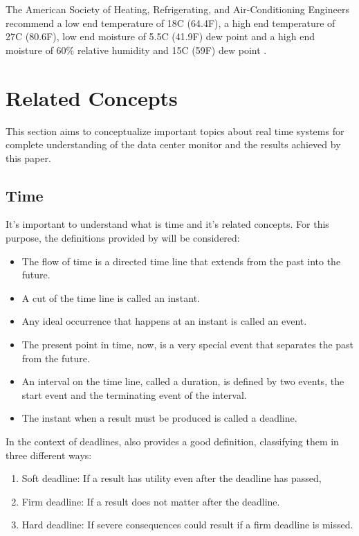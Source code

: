 \documentclass[12pt]{article}
\begin{document}
The American Society of Heating, Refrigerating, and Air-Conditioning Engineers recommend a low end temperature of
18\degree C (64.4\degree F), a high end temperature of 27\degree C (80.6\degree F), low end moisture of 5.5\degree C 
(41.9\degree F) dew point and a high end moisture of 60\% relative humidity and 15\degree C (59\degree F) dew 
point \cite{ashrae9}.
\fi

\section{Related Concepts}

This section aims to conceptualize important topics about real time systems for complete understanding of the data center 
monitor and the results achieved by this paper.

\subsection{Time}

It's important to understand what is time and it's related concepts. For this purpose, the definitions provided by
\cite{kopetz2011real} will be considered: 
\begin{itemize}
 \item The flow of time is a directed time line that extends from the past into the future.
 \item A cut of the time line is called an instant.
 \item Any ideal occurrence that happens at an instant is called an event.
 \item The present point in time, now, is a very special event that separates the past from the future.
 \item An interval on the time line, called a duration, is defined by two events, the start event and the 
terminating event of the interval.
 \item The instant when a result must be produced is called a deadline.
\end{itemize}

In the context of deadlines, \cite{kopetz2011real} also provides a good definition, classifying them in 
three different ways:
\begin{enumerate}
 \item Soft deadline: If a result has utility even after the deadline has passed,
 \item Firm deadline: If a result does not matter after the deadline.
 \item Hard deadline: If severe consequences could result if a firm deadline is missed.
\end{enumerate}
\end{document}
